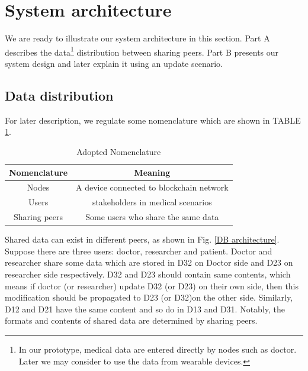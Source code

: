 \documentclass[conference]{IEEEtran}
\begin{document}



\section{System architecture}
\label{system}
     We are ready to illustrate our system architecture in this section. Part A describes the data\footnote{In our prototype, medical data are entered directly by nodes such as doctor. Later we may consider to use the data from wearable devices.} distribution between sharing peers. Part B presents our system design and later explain it using an update scenario.

\subsection{Data distribution}

For later description, we regulate some nomenclature which are shown in TABLE \ref{nomenclature}.

\begin{table}[htbp]
	\caption{Adopted Nomenclature}
	\begin{center}
		\begin{tabular}{c|c}
	    \hline
	    Nomenclature & Meaning \\
	    \hline
		Nodes & A device connected to blockchain network  \\
		Users &   stakeholders in medical scenarios\\ 
	    Sharing peers &  Some users who share the same data  \\
		\hline
		\end{tabular}
		\label{nomenclature}
	\end{center}
\end{table}

Shared data can exist in different peers, as shown in Fig. \ref{DB architecture}. Suppose there are three users: doctor, researcher and patient. Doctor and researcher share some data which are stored in D32 on Doctor side and D23 on researcher side respectively. D32 and D23 should contain same contents, which means if doctor (or researcher) update D32 (or D23) on their own side, then this modification should be propagated to D23 (or D32)on the other side. Similarly, D12 and D21 have the same content and so do in D13 and D31. Notably, the formats and contents of shared data are determined by sharing peers. %
\end{document}
